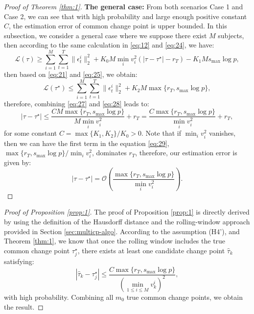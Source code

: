 \documentclass[11pt]{article}
\begin{document}
\begin{proof}[Proof of Theorem \ref{thm:1}]
\noindent
{\bf The general case:}
From both scenarios Case 1 and Case 2, we can see that with high probability and large enough positive constant $C$, the estimation error of common change point is upper bounded. In this subsection, we consider a general case where we suppose there exist $M$ subjects, then according to the same calculation in \eqref{eq:12} and \eqref{eq:24}, we have:
\begin{equation}
    \label{eq:27}
    \mathcal{L}(\tau) \geq \sum_{i=1}^M\sum_{t=1}^T\|\epsilon_t^i\|_2^2 + K_0M\min_i v_i^2(|\tau - \tau^\star| - r_T) - K_1 Ms_{\max}\log p,
\end{equation}
then based on \eqref{eq:21} and \eqref{eq:25}, we obtain:
\begin{equation}
    \label{eq:28}
    \mathcal{L}(\tau^\star) \leq \sum_{i=1}^M\sum_{t=1}^T\|\epsilon_t^i\|_2^2 + K_2 M\max\{r_T, s_{\max}\log p\},
\end{equation}
therefore, combining \eqref{eq:27} and \eqref{eq:28} leads to:
\begin{equation}
    \label{eq:29}
    |\tau-\tau^\star| \leq \frac{CM\max\{r_T, s_{\max}\log p\}}{M\min_i v_i^2} + r_T = \frac{C\max\{r_T, s_{\max}\log p\}}{\min_i v_i^2} + r_T,
\end{equation}
for some constant $C = \max\{K_1, K_2\}/K_0>0$. Note that if $\min_i v_i^2$ vanishes, then we can have the first term in the equation \eqref{eq:29}, $\max\{r_T, s_{\max}\log p\}/\min_i v_i^2$, dominates $r_T$, therefore, our estimation error is given by:
\begin{equation}
    \label{eq:30}
    |\tau-\tau^\star| = \mathcal{O}\left(\frac{\max\{r_T, s_{\max}\log p\}}{\min_i v_i^2}\right).
\end{equation}
\end{proof}

\begin{proof}[Proof of Proposition \ref{prop:1}]
    The proof of Proposition \ref{prop:1} is directly derived by using the definition of the Hausdorff distance and the rolling-window approach provided in Section \ref{sec:multicp-algo}. According to the assumption (H4'), and Theorem \ref{thm:1}, we know that once the rolling window includes the true common change point $\tau_j^\star$, there exists at least one candidate change point $\widehat{\tau}_k$ satisfying:
    \begin{equation*}
        |\widehat{\tau}_k - \tau_j^\star| \leq \frac{C\max\{r_T, s_{\max}\log p\}}{(\min_{1\leq i \leq M}v_k^i)^2},
    \end{equation*}
    with high probability. Combining all $m_0$ true common change points, we obtain the result.
\end{proof}
\end{document}
